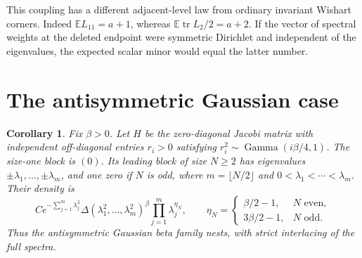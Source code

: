 \documentclass[10pt]{amsart}
\newtheorem{corollary}[theorem]{Corollary}
\DeclareMathOperator{\tr}{tr}
\newcommand{\E}{\mathbb E}
\begin{document}
This coupling has a different adjacent-level law from ordinary
invariant Wishart corners. Indeed $\E L_{11}=a+1$, whereas
$\E\tr L_2/2=a+2$. If the vector of spectral weights at the deleted endpoint
were symmetric Dirichlet and independent of the
eigenvalues, the expected scalar minor would equal the latter number.

\section{The antisymmetric Gaussian case}
\begin{corollary}\label{cor:anti}
Fix $\beta>0$. Let $H$ be the zero-diagonal Jacobi matrix with
independent off-diagonal entries $r_i>0$ satisfying
$r_i^2\sim\operatorname{Gamma}(i\beta/4,1)$. The size-one block is $(0)$.
Its leading block of size $N\geq2$ has eigenvalues
$\pm\lambda_1,\ldots,\pm\lambda_m$, and one
zero if $N$ is odd, where $m=\lfloor N/2\rfloor$ and
$0<\lambda_1<\cdots<\lambda_m$. Their density is
\begin{equation}\label{eq:anti}
 C e^{-\sum_{j=1}^m\lambda_j^2}\Delta(\lambda_1^2,\ldots,\lambda_m^2)^\beta
 \prod_{j=1}^m\lambda_j^{\eta_N},\qquad
 \eta_N=\begin{cases}\beta/2-1,&N\text{ even},\\
 3\beta/2-1,&N\text{ odd}.\end{cases}
\end{equation}
Thus the antisymmetric Gaussian beta family nests, with strict
interlacing of the full spectra.
\end{corollary}
\end{document}
